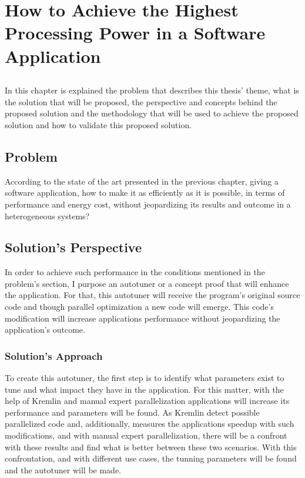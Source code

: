 \chapter{How to Achieve the Highest Processing Power in a Software Application}\label{chap:chap3}

\section*{}

In this chapter is explained the problem that describes this thesis' theme, what is the solution that will be proposed, the perspective and concepts behind the proposed solution and the methodology that will be used to achieve the proposed solution and how to validate this proposed solution. 

\section{Problem}

According to the state of the art presented in the previous chapter, giving a software application, how to make it as efficiently as it is possible, in terms of performance and energy cost, without jeopardizing its results and outcome in a heterogeneous systems? 


\section{Solution's Perspective}

In order to achieve such performance in the conditions mentioned in the problem's section, I purpose an autotuner or a concept proof that will enhance the application. For that, this autotuner will receive the program's original source code and though parallel optimization a new code will emerge. This code's modification will increase applications performance without jeopardizing the application's outcome.

\subsection{Solution's Approach}

To create this autotuner, the first step is to identify what parameters exist to tune and what impact they have in the application. For this matter, with the help of Kremlin and manual expert parallelization applications will increase its performance and parameters will be found. As Kremlin detect possible parallelized code and, additionally, measures the applications speedup with such modifications, and with manual expert parallelization, there will be a confront with these results and find what is better between these two scenarios. With this confrontation, and with different use cases, the tunning parameters will be found and the autotuner will be made.

